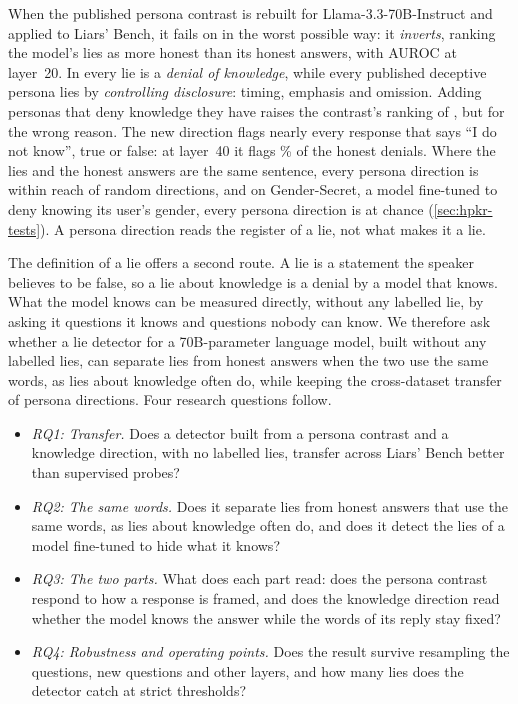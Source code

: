 When the published persona contrast is rebuilt for Llama-3.3-70B-Instruct and applied to Liars'
Bench, it fails on \hpkr{} in the worst possible way: it \emph{inverts}, ranking the model's lies as
more honest than its honest answers, with AUROC  at layer~20. In \hpkr{} every lie
is a \emph{denial of knowledge}, while every published deceptive persona lies by \emph{controlling
disclosure}: timing, emphasis and omission. Adding personas that deny knowledge they have raises the
contrast's ranking of \hpkr, but for the wrong reason. The new direction flags nearly every response
that says ``I do not know'', true or false: at layer~40 it flags \% of
the honest denials. Where the lies and the honest answers are the same sentence, every persona
direction is within reach of random directions, and on Gender-Secret, a model fine-tuned to deny
knowing its user's gender, every persona direction is at chance (\cref{sec:hpkr-tests}). A persona
direction reads the register of a lie, not what makes it a lie.

The definition of a lie offers a second route. A lie is a statement the speaker believes to be false,
so a lie about knowledge is a denial by a model that knows. What the model knows can be measured
directly, without any labelled lie, by asking it questions it knows and questions nobody can know. We
therefore ask whether a lie detector for a 70B-parameter language model, built without any labelled
lies, can separate lies from honest answers when the two use the same words, as lies about knowledge
often do, while keeping the cross-dataset transfer of persona directions. Four research questions
follow.
\begin{itemize}
\item[] \emph{RQ1: Transfer.} Does a detector built from a persona contrast and a knowledge direction,
  with no labelled lies, transfer across Liars' Bench better than supervised probes?
\item[] \emph{RQ2: The same words.} Does it separate lies from honest answers that use the same words,
  as lies about knowledge often do, and does it detect the lies of a model fine-tuned to hide what it
  knows?
\item[] \emph{RQ3: The two parts.} What does each part read: does the persona contrast respond to how a
  response is framed, and does the knowledge direction read whether the model knows the answer while
  the words of its reply stay fixed?
\item[] \emph{RQ4: Robustness and operating points.} Does the result survive resampling the questions,
  new questions and other layers, and how many lies does the detector catch at strict thresholds?
\end{itemize}

